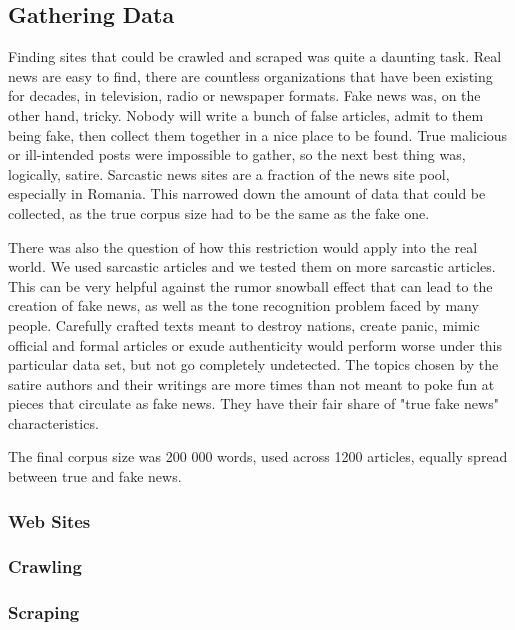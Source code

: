 \documentclass{article}
\begin{document}
	\subsection{Gathering Data}
	Finding sites that could be crawled and scraped was quite a daunting task. Real news are easy to find, there are countless organizations that have been existing for decades, in television, radio or newspaper formats. Fake news was, on the other hand, tricky. Nobody will write a bunch of false articles, admit to them being fake, then collect them together in a nice place to be found. True malicious or ill-intended posts were impossible to gather, so the next best thing was, logically, satire. Sarcastic news sites are a fraction of the news site pool, especially in Romania. This narrowed down the amount of data that could be collected, as the true corpus size had to be the same as the fake one. 
	\par There was also the question of how this restriction would apply into the real world. We used sarcastic articles and we tested them on more sarcastic articles. This can be very helpful against the rumor snowball effect that can lead to the creation of fake news, as well as the tone recognition problem faced by many people. Carefully crafted texts meant to destroy nations, create panic, mimic official and formal articles or exude authenticity would perform worse under this particular data set, but not go completely undetected. The topics chosen by the satire authors and their writings are more times than not meant to poke fun at pieces that circulate as fake news. They have their fair share of "true fake news" characteristics.
	\par The final corpus size was 200 000 words, used across 1200 articles, equally spread between true and fake news.

	\subsubsection{Web Sites}
	 
	\par


	\subsubsection{Crawling}
	\subsubsection{Scraping}
\end{document}
